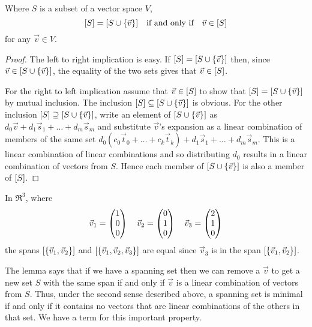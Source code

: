\begin{lemma}  \label{le:VecInSpanIffSpanUnchByAddVec}
Where \( S \) is a subset of a vector space $V$,
\begin{equation*}
  \relax [S\relax ]=\relax [S\cup\mbox{$\{\vec{v}\}$}\relax ]
  \quad\text{if and only if}\quad
  \vec{v}\in\relax [S\relax ]
\end{equation*}
for any $\vec{v}\in V$.
\end{lemma}

\begin{proof}
The left to right implication is easy.
If $\relax [S\relax ]=\relax [S\cup\mbox{$\{\vec{v}\}$}\relax ]$
then, since \( \vec{v}\in\relax [S\cup\mbox{$\{\vec{v}\}$}\relax ] \),
the equality of the two sets gives that \( \vec{v}\in\relax [S\relax ] \).

For the right to left implication assume that \( \vec{v}\in \relax [S\relax ] \) to
show that \( \relax [S\relax ]=\relax [S\cup\mbox{$\{\vec{v}\}$}\relax ] \) by mutual inclusion.
The inclusion \( \relax [S\relax ]\subseteq\relax [S\cup\mbox{$\{\vec{v}\}$}\relax ] \) is
obvious.
For the other inclusion \( \relax [S\relax ]\supseteq\relax [S\cup\mbox{$\{\vec{v}\}$}\relax ] \),
write an element of \( \relax [S\cup\mbox{$\{\vec{v}\}$}\relax ] \) as
\( d_0\vec{v}+d_1\vec{s}_1+\dots+d_m\vec{s}_m \)
and substitute \( \vec{v} \)'s expansion
as a linear combination of members of the same set
\( d_0(c_0\vec{t}_0+\dots+c_k\vec{t}_k)+d_1\vec{s}_1+\dots+d_m\vec{s}_m \).
This is a linear combination of linear combinations and so 
distributing \( d_0 \) results in
a linear combination of vectors from \( S \).
Hence each member of $\relax [S\cup\mbox{$\{\vec{v}\}$}\relax ]$ is also 
a member of $\relax [S\relax ]$.
\end{proof}

\begin{example}
In \( \Re^3 \), where
\begin{equation*}
  \vec{v}_1=\begin{pmatrix} 1 \\ 0 \\ 0 \end{pmatrix}\quad
  \vec{v}_2=\begin{pmatrix} 0 \\ 1 \\ 0 \end{pmatrix}\quad
  \vec{v}_3=\begin{pmatrix} 2 \\ 1 \\ 0 \end{pmatrix}
\end{equation*}
the spans \( \relax [\mbox{$\{\vec{v}_1,\vec{v}_2\}$}\relax ] \) and
\( \relax [\mbox{$\{\vec{v}_1,\vec{v}_2,\vec{v}_3\}$}\relax ] \) are equal since
\( \vec{v}_3 \) is in the span \( \relax [\mbox{$\{\vec{v}_1,\vec{v}_2\}$}\relax ] \).
\end{example}

The lemma says that if we have a spanning set 
then we can remove a $\vec{v}$ to get a new set $S$ 
with the same span if and only if
$\vec{v}$ is a linear combination of vectors from $S$.
Thus, under the second sense described above, a spanning set is minimal
if and only if it contains
no vectors that are linear combinations of the others in that set.
We have a term for this important property.

